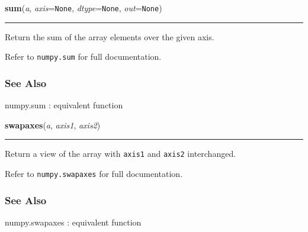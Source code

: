     \label{numpy:ndarray:sum}

    \vspace{0.5ex}

    \begin{boxedminipage}{\textwidth}

    \raggedright \textbf{sum}(\textit{a}, \textit{axis}=\texttt{None}, \textit{dtype}=\texttt{None}, \textit{out}=\texttt{None})

    \vspace{-1.5ex}

    \rule{\textwidth}{0.5\fboxrule}

Return the sum of the array elements over the given axis.

Refer to \texttt{numpy.sum} for full documentation.



\hypertarget{see-also}{}
\subsubsection*{See Also}

numpy.sum : equivalent function
    \vspace{1ex}

    \end{boxedminipage}

    \label{numpy:ndarray:swapaxes}

    \vspace{0.5ex}

    \begin{boxedminipage}{\textwidth}

    \raggedright \textbf{swapaxes}(\textit{a}, \textit{axis1}, \textit{axis2})

    \vspace{-1.5ex}

    \rule{\textwidth}{0.5\fboxrule}

Return a view of the array with \texttt{axis1} and \texttt{axis2} interchanged.

Refer to \texttt{numpy.swapaxes} for full documentation.



\hypertarget{see-also}{}
\subsubsection*{See Also}

numpy.swapaxes : equivalent function
    \vspace{1ex}

    \end{boxedminipage}

